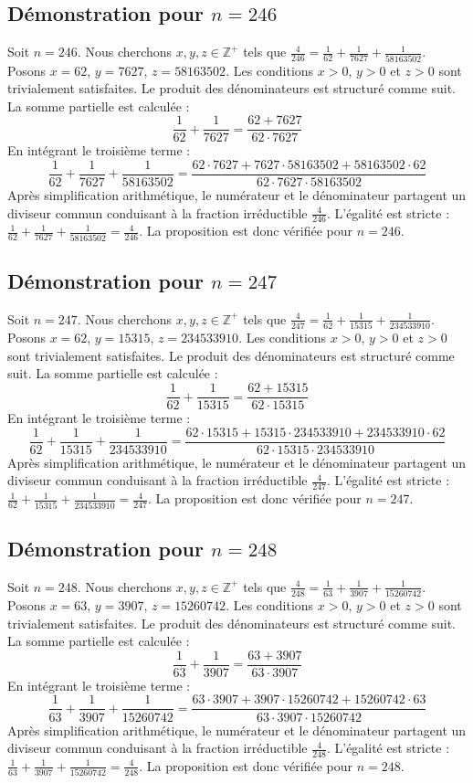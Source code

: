\documentclass[11pt,a4paper]{article}
\begin{document}
\subsection{Démonstration pour $n = 246$}
Soit $n = 246$. Nous cherchons $x, y, z \in \mathbb{Z}^{+}$ tels que $\frac{4}{246} = \frac{1}{62} + \frac{1}{7627} + \frac{1}{58163502}$.
Posons $x = 62$, $y = 7627$, $z = 58163502$.
Les conditions $x > 0$, $y > 0$ et $z > 0$ sont trivialement satisfaites.
Le produit des dénominateurs est structuré comme suit. La somme partielle est calculée :
$$ \frac{1}{62} + \frac{1}{7627} = \frac{62+7627}{62 \cdot 7627} $$
En intégrant le troisième terme :
$$ \frac{1}{62} + \frac{1}{7627} + \frac{1}{58163502} = \frac{62 \cdot 7627 + 7627 \cdot 58163502 + 58163502 \cdot 62}{62 \cdot 7627 \cdot 58163502} $$
Après simplification arithmétique, le numérateur et le dénominateur partagent un diviseur commun conduisant à la fraction irréductible $\frac{4}{246}$.
L'égalité est stricte : $\frac{1}{62} + \frac{1}{7627} + \frac{1}{58163502} = \frac{4}{246}$.
La proposition est donc vérifiée pour $n = 246$.
\subsection{Démonstration pour $n = 247$}
Soit $n = 247$. Nous cherchons $x, y, z \in \mathbb{Z}^{+}$ tels que $\frac{4}{247} = \frac{1}{62} + \frac{1}{15315} + \frac{1}{234533910}$.
Posons $x = 62$, $y = 15315$, $z = 234533910$.
Les conditions $x > 0$, $y > 0$ et $z > 0$ sont trivialement satisfaites.
Le produit des dénominateurs est structuré comme suit. La somme partielle est calculée :
$$ \frac{1}{62} + \frac{1}{15315} = \frac{62+15315}{62 \cdot 15315} $$
En intégrant le troisième terme :
$$ \frac{1}{62} + \frac{1}{15315} + \frac{1}{234533910} = \frac{62 \cdot 15315 + 15315 \cdot 234533910 + 234533910 \cdot 62}{62 \cdot 15315 \cdot 234533910} $$
Après simplification arithmétique, le numérateur et le dénominateur partagent un diviseur commun conduisant à la fraction irréductible $\frac{4}{247}$.
L'égalité est stricte : $\frac{1}{62} + \frac{1}{15315} + \frac{1}{234533910} = \frac{4}{247}$.
La proposition est donc vérifiée pour $n = 247$.
\subsection{Démonstration pour $n = 248$}
Soit $n = 248$. Nous cherchons $x, y, z \in \mathbb{Z}^{+}$ tels que $\frac{4}{248} = \frac{1}{63} + \frac{1}{3907} + \frac{1}{15260742}$.
Posons $x = 63$, $y = 3907$, $z = 15260742$.
Les conditions $x > 0$, $y > 0$ et $z > 0$ sont trivialement satisfaites.
Le produit des dénominateurs est structuré comme suit. La somme partielle est calculée :
$$ \frac{1}{63} + \frac{1}{3907} = \frac{63+3907}{63 \cdot 3907} $$
En intégrant le troisième terme :
$$ \frac{1}{63} + \frac{1}{3907} + \frac{1}{15260742} = \frac{63 \cdot 3907 + 3907 \cdot 15260742 + 15260742 \cdot 63}{63 \cdot 3907 \cdot 15260742} $$
Après simplification arithmétique, le numérateur et le dénominateur partagent un diviseur commun conduisant à la fraction irréductible $\frac{4}{248}$.
L'égalité est stricte : $\frac{1}{63} + \frac{1}{3907} + \frac{1}{15260742} = \frac{4}{248}$.
La proposition est donc vérifiée pour $n = 248$.
\end{document}
